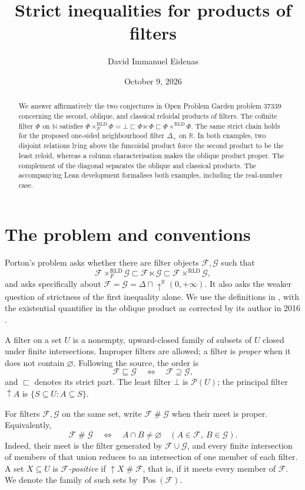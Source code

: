 \documentclass[11pt,a4paper]{amsart}
\title{Strict inequalities for products of filters}
\author{David Immanuel Eidenas}
\date{October 9, 2026}
\theoremstyle{definition}
\theoremstyle{remark}
\newcommand{\RLD}{\mathrm{RLD}}
\newcommand{\Pos}{\operatorname{Pos}}
\newcommand{\N}{\mathbb{N}}
\newcommand{\R}{\mathbb{R}}
\newcommand{\cF}{\mathcal{F}}
\newcommand{\cG}{\mathcal{G}}
\begin{document}
\begin{abstract}
We answer affirmatively the two conjectures in Open Problem Garden problem
37339 concerning the second, oblique, and classical reloidal products of
filters. The cofinite filter $\Phi$ on $\N$ satisfies
$\Phi\times_F^{\RLD}\Phi=\bot\sqsubset\Phi\ltimes\Phi
\sqsubset\Phi\times^{\RLD}\Phi$.
The same strict chain holds for the proposed one-sided neighbourhood filter
$\Delta_+$ on $\R$. In both examples, two disjoint relations lying above the
funcoidal product force the second product to be the least reloid, whereas a
column characterisation makes the oblique product proper. The complement of
the diagonal separates the oblique and classical products. The accompanying
Lean development formalises both examples, including the real-number case.
\end{abstract}

\maketitle
\markboth{\shortauthors}{\shorttitle}

\section{The problem and conventions}

Porton's problem \cite{garden} asks whether there are filter objects
$\cF,\cG$ such that
\begin{equation}\label{eq:problem}
  \cF\times_F^{\RLD}\cG
  \sqsubset \cF\ltimes\cG
  \sqsubset \cF\times^{\RLD}\cG,
\end{equation}
and asks specifically about
$\cF=\cG=\Delta\sqcap\uparrow^{\R}(0,+\infty)$.
It also asks the weaker question of strictness of the first inequality alone.
We use the definitions in \cite{porton}, with the existential quantifier in
the oblique product as corrected by its author in 2016 \cite{erratum}.

A filter on a set $U$ is a nonempty, upward-closed family of subsets of $U$
closed under finite intersections. Improper filters are allowed; a filter is
\emph{proper} when it does not contain $\varnothing$.
Following the source, the order is
\[
  \cF\sqsubseteq\cG \quad\Longleftrightarrow\quad \cF\supseteq\cG,
\]
and $\sqsubset$ denotes its strict part. The least filter $\bot$ is
$\mathcal P(U)$; the principal filter $\uparrow A$ is
$\{S\subseteq U:A\subseteq S\}$.

For filters $\cF,\cG$ on the same set, write $\cF\mathrel{\#}\cG$ when
their meet is proper. Equivalently,
\begin{equation}\label{eq:mesh}
  \cF\mathrel{\#}\cG
  \quad\Longleftrightarrow\quad
  A\cap B\ne\varnothing \quad(A\in\cF,\ B\in\cG).
\end{equation}
Indeed, their meet is the filter generated by $\cF\cup\cG$, and every finite
intersection of members of that union reduces to an intersection of one
member of each filter. A set $X\subseteq U$ is \emph{$\cF$-positive} if
$\uparrow X\mathrel{\#}\cF$, that is, if it meets every member of $\cF$.
We denote the family of such sets by $\Pos(\cF)$.
\end{document}
